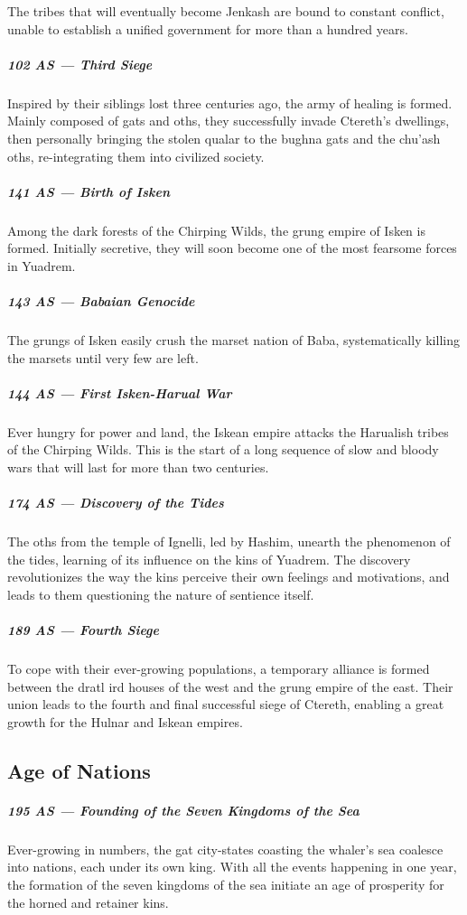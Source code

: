 \begin{linenumbers}
The tribes that will eventually become Jenkash are bound to constant conflict, unable to establish a unified government for more than a hundred years.

\subparagraph{102 AS --- Third Siege} Inspired by their siblings lost three centuries ago, the army of healing is formed.
Mainly composed of gats and oths, they successfully invade Ctereth's dwellings, then personally bringing the stolen qualar to the bughna gats and the chu'ash oths, re-integrating them into civilized society.

\subparagraph{141 AS --- Birth of Isken} Among the dark forests of the Chirping Wilds, the grung empire of Isken is formed.
Initially secretive, they will soon become one of the most fearsome forces in Yuadrem.

\subparagraph{143 AS --- Babaian Genocide} The grungs of Isken easily crush the marset nation of Baba, systematically killing the marsets until very few are left.

\subparagraph{144 AS --- First Isken-Harual War} Ever hungry for power and land, the Iskean empire attacks the Harualish tribes of the Chirping Wilds.
This is the start of a long sequence of slow and bloody wars that will last for more than two centuries.

\subparagraph{174 AS --- Discovery of the Tides} The oths from the temple of Ignelli, led by Hashim, unearth the phenomenon of the tides, learning of its influence on the kins of Yuadrem.
The discovery revolutionizes the way the kins perceive their own feelings and motivations, and leads to them questioning the nature of sentience itself.

\subparagraph{189 AS --- Fourth Siege} To cope with their ever-growing populations, a temporary alliance is formed between the dratl ird houses of the west and the grung empire of the east.
Their union leads to the fourth and final successful siege of Ctereth, enabling a great growth for the Hulnar and Iskean empires.

\subsection*{Age of Nations}
\subparagraph{195 AS --- Founding of the Seven Kingdoms of the Sea} Ever-growing in numbers, the gat city-states coasting the whaler's sea coalesce into nations, each under its own king.
With all the events happening in one year, the formation of the seven kingdoms of the sea initiate an age of prosperity for the horned and retainer kins.


\end{linenumbers}
